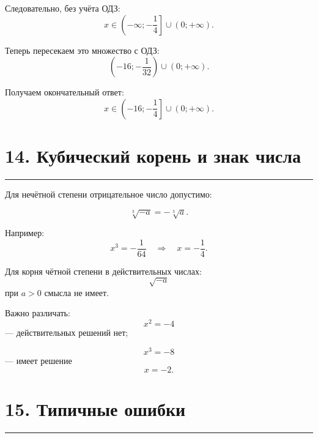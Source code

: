 \documentclass[a4paper,12pt]{article}
\newcommand{\sectionline}{%
    \vspace{0.2em}
    \noindent\color{linegray}\rule{\linewidth}{0.6pt}
    \vspace{0.4em}
}
\begin{document}
Следовательно, без учёта ОДЗ:
\[
x\in
\left(-\infty;-\frac14\right]
\cup
(0;+\infty).
\]

Теперь пересекаем это множество с ОДЗ:
\[
\left(-16;-\frac1{32}\right)
\cup
(0;+\infty).
\]

Получаем окончательный ответ:
\[
\boxed{
x\in
\left(-16;-\frac14\right]
\cup
(0;+\infty)
}.
\]

\section*{\color{darkaccent}14. Кубический корень и знак числа}
\sectionline

Для нечётной степени отрицательное число допустимо:

\[
\sqrt[3]{-a}=-\sqrt[3]{a}.
\]

Например:
\[
x^3=-\frac1{64}
\quad\Longrightarrow\quad
x=-\frac14.
\]

Для корня чётной степени в действительных числах:
\[
\sqrt{-a}
\]
при \(a>0\) смысла не имеет.

Важно различать:
\[
x^2=-4
\]
--- действительных решений нет;

\[
x^3=-8
\]
--- имеет решение
\[
x=-2.
\]

\section*{\color{darkaccent}15. Типичные ошибки}
\sectionline
\end{document}
